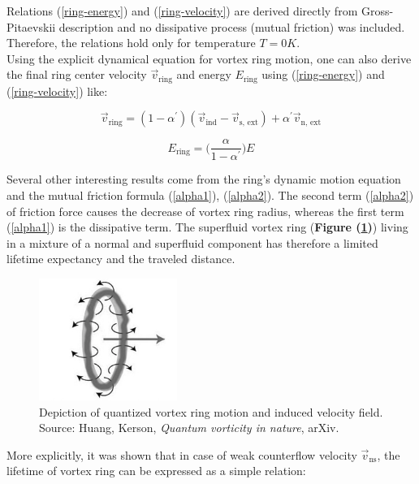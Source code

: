 Relations (\ref{ring-energy}) and (\ref{ring-velocity}) are derived directly from Gross-Pitaevskii description and no dissipative process (mutual friction) was included. Therefore, the relations hold only for temperature $T=0\unit{K}$.\\
Using the explicit dynamical equation \cite{donnelly_book} for vortex ring motion, one can also derive the final ring center velocity $\vec{v}_{\text{ring}}$ and energy $E_{\text{ring}}$ using (\ref{ring-energy}) and (\ref{ring-velocity}) like:

\begin{equation}
\vec{v}_{\text{ring}} = (1 - \alpha^{\prime}) (\vec{v}_{\text{ind}} - \vec{v}_{\text{s, ext}})
+ \alpha^{\prime} \vec{v}_{\text{n, ext}}
\label{v_ring}
\end{equation}

\begin{equation}
E_{\text{ring}} = \Big( \frac{\alpha}{1 - \alpha^{\prime}} \Big) E
\label{E_ring}
\end{equation}

Several other interesting results come from the ring's dynamic motion equation and the mutual friction formula (\ref{alpha1}), (\ref{alpha2}). The second term (\ref{alpha2}) of friction force causes the decrease of vortex ring radius, whereas the first term (\ref{alpha1}) is the dissipative term. The superfluid vortex ring (\textbf{Figure (\ref{vortex-ring})}) living in a mixture of a normal and superfluid component has therefore a limited lifetime expectancy and the traveled distance.

\begin{figure}[h]
	\centering
	\includegraphics[width=0.4\textwidth]{graphics/theory/vortex-ring}
	\caption{Depiction of quantized vortex ring motion and induced velocity field. Source: Huang, Kerson, \textit{Quantum vorticity in nature}, arXiv.}
	\label{vortex-ring}
\end{figure}

More explicitly, it was shown \cite{donnelly_book} that in case of weak counterflow velocity $\vec{v}_{\text{ns}}$, the lifetime of vortex ring can be expressed as a simple relation:

